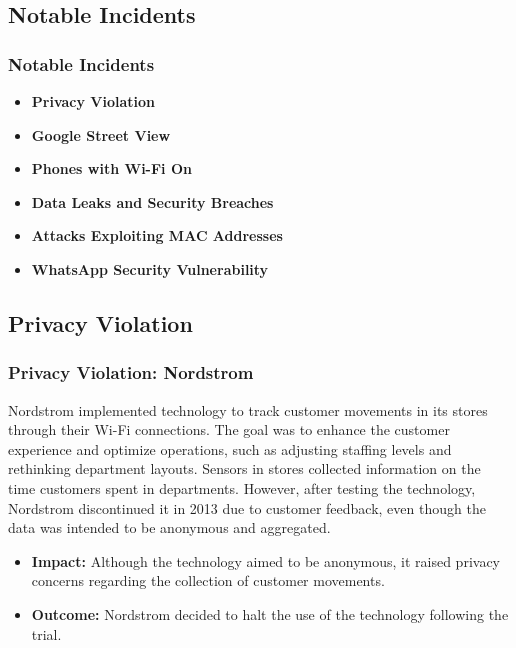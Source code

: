 \documentclass[
	11pt, %
]{beamer}
\begin{document}
\begin{frame}
  \section{Notable Incidents}
  \frametitle{Notable Incidents}
  \begin{itemize}
    \item \textbf{Privacy Violation} \pause
    \item \textbf{Google Street View} \pause
    \item \textbf{Phones with Wi-Fi On} \pause
    \item \textbf{Data Leaks and Security Breaches} \pause
    \item \textbf{Attacks Exploiting MAC Addresses} \pause
    \item \textbf{WhatsApp Security Vulnerability} 
  \end{itemize}
\end{frame}

\begin{frame}
  \section{Privacy Violation}
  \frametitle{Privacy Violation: Nordstrom}
  Nordstrom implemented technology to track customer movements in its stores through their Wi-Fi connections. The goal was to enhance the customer experience and optimize operations, such as adjusting staffing levels and rethinking department layouts. Sensors in stores collected information on the time customers spent in departments. However, after testing the technology, Nordstrom discontinued it in 2013 due to customer feedback, even though the data was intended to be anonymous and aggregated.
  \begin{itemize}
    \item \textbf{Impact:} Although the technology aimed to be anonymous, it raised privacy concerns regarding the collection of customer movements. \pause
    \item \textbf{Outcome:} Nordstrom decided to halt the use of the technology following the trial. 
  \end{itemize}
\end{frame}
\end{document}
